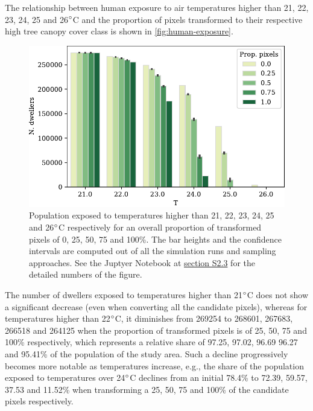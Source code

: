 \documentclass[10pt,letterpaper]{article}
\begin{document}
The relationship between human exposure to air temperatures higher than 21, 22, 23, 24, 25 and 26$\degree$C and the proportion of pixels transformed to their respective high tree canopy cover class is shown in \autoref{fig:human-exposure}.
\begin{figure}[ht]
  \centering
  \includegraphics[width=.6\textwidth]{figures/human-exposure}
  \caption{\label{fig:human-exposure} Population exposed to temperatures higher than 21, 22, 23, 24, 25 and 26$\degree$C respectively for an overall proportion of transformed pixels of 0, 25, 50, 75 and 100\%. The bar heights and the confidence intervals are computed out of all the simulation runs and sampling approaches. See the Juptyer Notebook at \hyperref[sec:si-human-exposure]{section S2.3} for the detailed numbers of the figure.}
\end{figure}
The number of dwellers exposed to temperatures higher than 21$\degree$C does not show a significant decrease (even when converting all the candidate pixels), whereas for temperatures higher than 22$\degree$C, it diminishes from 269254 to 268601, 267683, 266518 and 264125 when the proportion of transformed pixels is of 25, 50, 75 and 100\% respectively, which represents a relative share of 97.25, 97.02, 96.69 96.27 and 95.41\% of the population of the study area.
Such a decline progressively becomes more notable as temperatures increase, e.g., the share of the population exposed to temperatures over 24$\degree$C declines from an initial 78.4\% to 72.39, 59.57, 37.53 and 11.52\% when transforming a 25, 50, 75 and 100\% of the candidate pixels respectively.
\end{document}
